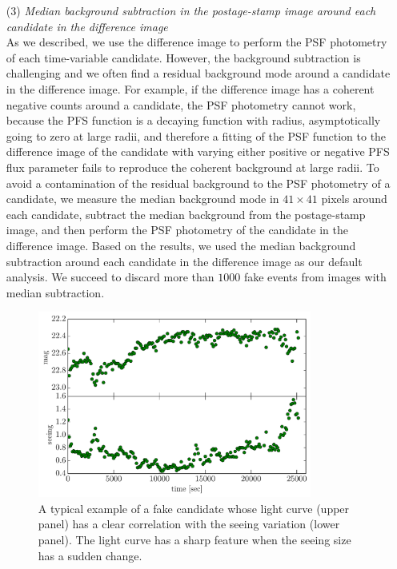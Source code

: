 \documentclass[iop, apj]{emulateapj}
\newcommand{\?}{\stackrel{?}{=}}
\begin{document}
\begin{itemize}
\item[(3)]{\it Median background subtraction in the postage-stamp image around each candidate in the difference image}\\
As we described, we use the difference image to perform the PSF photometry of each time-variable candidate. However, the background subtraction is challenging and we often find a residual background mode around a candidate in the difference image. 
For example, if the difference image has a coherent negative counts around a candidate, the PSF photometry cannot work, because the PFS function is a decaying function with radius, asymptotically going to zero at large radii, and therefore a fitting of the PSF function to the difference image of the candidate with varying either positive or negative PFS flux parameter fails to reproduce the coherent background at large radii. 
To avoid a contamination of the residual background to the PSF photometry of a candidate, we measure the median background mode in $41 \times 41$ pixels around each candidate, subtract the median background from the postage-stamp image, and then perform the PSF photometry of the candidate in the difference image. 
Based on the results, we used the median background subtraction around each candidate in the difference image as our default analysis. We succeed to discard more than $1000$ fake events from images with median subtraction. 
%
\begin{figure}[t]
\centering
\includegraphics[width=9cm,clip]{pic/6,7_lightcurve_seeing.pdf}
\caption{\small{A typical example of a fake candidate whose light curve (upper panel) has a clear correlation with the seeing variation (lower panel). The light curve has a sharp feature when the seeing size has a sudden change. }}
\label{fig:corrcurve}
\end{figure}

\end{itemize}
\end{document}

